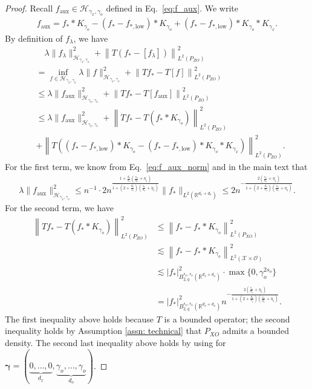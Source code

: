 \documentclass[11pt]{article}
\newcommand{\bgamma}{\boldsymbol{\gamma}}
\newcommand{\calH}{\mathcal{H}}
\newcommand{\calO}{\mathcal{O}}
\newcommand{\calX}{\mathcal{X}}
\newcommand{\R}{\mathbb{R}}
\newcommand{\0}{\mathbf{0}}
\begin{document}
\begin{appendix}
\begin{proof}
Recall $f_{\mathrm{aux}}\in \calH_{\gamma_x,\gamma_o}$ defined in Eq.~\eqref{eq:f_aux}. We write 
\begin{align*}
    f_{\mathrm{aux}} = f_{\ast} \ast K_{\gamma_o} - (f_{\ast} - f_{\ast , \mathrm{low}}) \ast K_{\gamma_o} + (f_{\ast} - f_{\ast, \mathrm{low}}) \ast K_{\gamma_o} \ast K_{\gamma_x}
.\end{align*}
By definition of $f_\lambda$, we have
\begin{align}
    &\quad \lambda \| f_\lambda\|_{\calH_{\gamma_x,\gamma_o}}^2 + \left\|T\left(f_{\ast} - \left[f_{\lambda}\right]\right)\right\|_{L^2(P_{ZO})}^2 
    \nonumber \\
    &=\inf_{f\in \calH_{\gamma_x,\gamma_o}}\lambda \|f\|_{\calH_{\gamma_x,\gamma_o}}^2 + \left\|Tf_{\ast} - T[f]\right\|_{L^2(P_{ZO})}^2\nonumber \\
    &\leq \lambda \|f_{\mathrm{aux}}\|_{\calH_{\gamma_x,\gamma_o}}^2 + \left\|Tf_{\ast} - T[f_{\mathrm{aux}}]\right\|_{L^2(P_{ZO})}^2 \nonumber \\
    &\leq \lambda \|f_{\mathrm{aux}} \|_{\calH_{\gamma_x,\gamma_o}}^2 + \left\|Tf_{\ast} - T \left(f_{\ast} \ast K_{\gamma_o} \right)\right\|_{L^2(P_{ZO})}^2 \nonumber \\
    &+\left\| T\left((f_{\ast} - f_{\ast , \mathrm{low}}) \ast K_{\gamma_o} - (f_{\ast} - f_{\ast, \mathrm{low}}) \ast K_{\gamma_o} \ast K_{\gamma_x}\right) \right\|_{L^2(P_{ZO})}^2. \label{eq:proj_approx_error}
\end{align}
For the first term, we know from Eq.~\eqref{eq:f_aux_norm} and  in the main text that 
\begin{align*}
    \lambda\|f_{\mathrm{aux}}\|_{\calH_{\gamma_x,\gamma_o}}^2 \leq n^{-1} \cdot 2 n^{\frac{1+\frac{d_o}{s_o}(\frac{s_x}{d_x}+\eta_1)}{1+(2+\frac{d_o}{s_o})(\frac{s_x}{d_x}+\eta_1)}} \|f_\ast\|_{L^2(\R^{d_x+d_o})} \leq 2 n^{-\frac{2(\frac{s_x}{d_x}+\eta_1)}{1+(2+\frac{d_o}{s_o})(\frac{s_x}{d_x}+\eta_1)}} .
\end{align*}
For the second term, we have
\begin{align*}
    \left\|Tf_{\ast} - T \left(f_{\ast} \ast K_{\gamma_o} \right)\right\|_{L^2(P_{ZO})}^2 &\leq \left\|f_{\ast} - f_{\ast} \ast K_{\gamma_o} \right\|_{L^2(P_{XO})}^2 \\
    &\lesssim \left\|f_{\ast} - f_{\ast} \ast K_{\gamma_o} \right\|_{L^2(\calX\times\calO)}^2 \\
    &\lesssim |f_{\ast}|^2_{B^{s_x,s_o}_{2,q}(\mathbb{R}^{d_x+d_o})} \cdot \max\{0, \gamma_o^{2s_o}\}\\
    &= |f_{\ast}|^2_{B^{s_x,s_o}_{2,q}(\mathbb{R}^{d_x+d_o})}  n^{-\frac{2(\frac{s_x}{d_x}+\eta_1)}{1+(2+\frac{d_o}{s_o})(\frac{s_x}{d_x}+\eta_1)}}.
\end{align*}
The first inequality above holds because $T$ is a bounded operator;
the second inequality holds by Assumption \ref{assn: technical} that $P_{XO}$ admits a bounded density. 
The second last inequality above holds by using  for $\bgamma = (\underbrace{0,\dots, 0}_{d_x},\underbrace{\gamma_o,\dots,\gamma_o}_{d_o})$. 


\end{proof}
\end{appendix}
\end{document}
